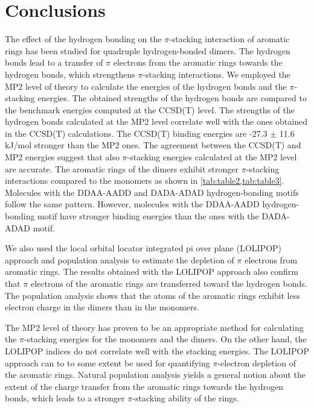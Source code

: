 \documentclass[twoside,twocolumn,9pt]{article}
\begin{document}
\section{Conclusions}
\label{sec:conclusions}

The effect of the hydrogen bonding on the $\pi$-stacking interaction of aromatic
rings has been studied for quadruple hydrogen-bonded dimers.  The hydrogen
bonds lead to a transfer of $\pi$ electrons from the aromatic rings towards the
hydrogen bonds, which strengthens $\pi$-stacking interactions.  We employed the
MP2 level of theory to calculate the energies of the hydrogen bonds and the
$\pi$-stacking energies.  The obtained strengths of the hydrogen bonds are
compared to the benchmark energies computed at the CCSD(T)
level\cite{Usman:paper-1}. The strengths of the hydrogen bonds calculated at
the MP2 level correlate well with the ones obtained in the  CCSD(T)
calculations. The CCSD(T) binding energies are -27.3 $\pm$ 11.6 kJ/mol stronger
than the MP2 ones. The agreement between the CCSD(T) and MP2 energies
suggest that also $\pi$-stacking energies calculated at the MP2 level are
accurate. The aromatic rings of the dimers exhibit stronger $\pi$-stacking
interactions compared to the monomers as shown in \cref{tab:table2,tab:table3}.
Molecules with the DDAA-AADD and DADA-ADAD hydrogen-bonding motifs follow the
same pattern. However, molecules with the DDAA-AADD hydrogen-bonding motif
have stronger binding energies than the ones with the DADA-ADAD motif.

We also used the local orbital locator integrated pi over plane (LOLIPOP)
approach and population analysis to estimate the depletion of $\pi$ electrons
from aromatic rings. The results obtained with the LOLIPOP approach also
confirm that $\pi$ electrons of the aromatic rings are transferred toward the
hydrogen bonds. The population analysis shows that the atoms of the aromatic
rings exhibit less electron charge in the dimers than in the monomers.

The MP2 level of theory has proven to be an appropriate method for
calculating the $\pi$-stacking energies for the monomers and the dimers.  On
the other hand, the LOLIPOP indices do not correlate well with the stacking
energies. The LOLIPOP approach can to to some extent be used for quantifying
$\pi$-electron depletion of the aromatic rings. Natural population analysis
yields a general notion about the extent of the charge transfer from the
aromatic rings towards the hydrogen bonds, which leads to a stronger
$\pi$-stacking ability of the rings.
\end{document}
